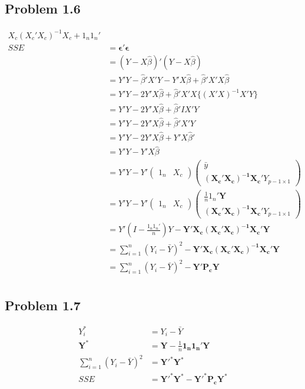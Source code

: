 \documentclass[a4paper]{article}
\begin{document}
\subsection*{Problem 1.6}
\begin{align*}
X_c(X_c'X_c)^{-1}X_c + 1_n1_n'\\
SSE &= \mathbf{\epsilon'\epsilon}\\
&=(Y-X\hat{\beta})'(Y-X\hat{\beta})\\
&= Y'Y-\hat{\beta}'X'Y-Y'X\hat{\beta}+\hat{\beta}'X'X\hat{\beta}\\
&= Y'Y-2Y'X\hat{\beta} + \hat{\beta}'X'X\{(X'X)^{-1}X'Y\}\\
&= Y'Y-2Y'X\hat{\beta} + \hat{\beta}'IX'Y\\
&= Y'Y-2Y'X\hat{\beta} + \hat{\beta}'X'Y\\
&= Y'Y-2Y'X\hat{\beta} + Y'X\hat{\beta}'\\
&= Y'Y-Y'X\hat{\beta}\\
&= Y'Y-Y'\begin{pmatrix}
1_n & X_c
\end{pmatrix}\begin{pmatrix}
\bar{y}\\
\mathbf{(X_c'X_c)^{-1}X_c}'Y_{p-1\times 1}
\end{pmatrix}\\
&=Y'Y-Y'\begin{pmatrix}
1_n & X_c
\end{pmatrix}\begin{pmatrix}
\frac{1}{n}1_n'\mathbf{Y}\\
\mathbf{(X_c'X_c)^{-1}X_c}'Y_{p-1\times 1}
\end{pmatrix}\\ 
&= Y'(I-\frac{1_n1_n'}{n})Y - \mathbf{Y'X_c}\mathbf{(X_c'X_c)^{-1}X_c}'\mathbf{Y}\\
&=\sum_{i=1}^n(Y_i-\bar{Y})^2 -\mathbf{Y'X_c}\mathbf{(X_c'X_c)^{-1}X_c}'\mathbf{Y}\\
&=\sum_{i=1}^n(Y_i-\bar{Y})^2 -\mathbf{Y'P_c}\mathbf{Y}\\
\end{align*}

\subsection*{Problem 1.7}

\begin{align*}
Y_i^* &= Y_i-\bar{Y}\\
\mathbf{Y}^* &= \mathbf{Y}-\frac{1}{n}\mathbf{1_n1_n'Y}\\
\sum_{i=1}^n(Y_i-\bar{Y})^2 &= \mathbf{Y'}^{*}\mathbf{Y}^*\\
SSE &= \mathbf{Y'}^{*}\mathbf{Y}^*-\mathbf{Y'^*P_c}\mathbf{Y^*}
\end{align*}
\end{document}
